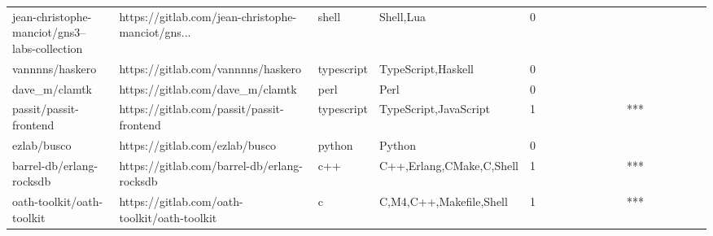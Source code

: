 \begin{tabular}{llllrlllllllllllll}
jean-christophe-manciot/gns3--labs-collection      &  https://gitlab.com/jean-christophe-manciot/gns... &             shell &                                          Shell,Lua &       0 &         &        &           &                &                 &        &           &           &          &          &       &              &          \\
vannnns/haskero                                    &                 https://gitlab.com/vannnns/haskero &        typescript &                                 TypeScript,Haskell &       0 &         &        &           &                &                 &        &           &           &          &          &       &              &          \\
dave\_m/clamtk                                      &                   https://gitlab.com/dave\_m/clamtk &              perl &                                               Perl &       0 &         &        &           &                &                 &        &           &           &          &          &       &              &          \\
passit/passit-frontend                             &          https://gitlab.com/passit/passit-frontend &        typescript &                              TypeScript,JavaScript &       1 &         &        &           &                &                 &        &           &       *** &          &          &       &              &          \\
ezlab/busco                                        &                     https://gitlab.com/ezlab/busco &            python &                                             Python &       0 &         &        &           &                &                 &        &           &           &          &          &       &              &          \\
barrel-db/erlang-rocksdb                           &        https://gitlab.com/barrel-db/erlang-rocksdb &               c++ &                           C++,Erlang,CMake,C,Shell &       1 &         &        &           &                &                 &        &           &       *** &          &          &       &              &          \\
oath-toolkit/oath-toolkit                          &       https://gitlab.com/oath-toolkit/oath-toolkit &                 c &                            C,M4,C++,Makefile,Shell &       1 &         &        &           &                &                 &        &           &       *** &          &          &       &              &          \\

\end{tabular}

